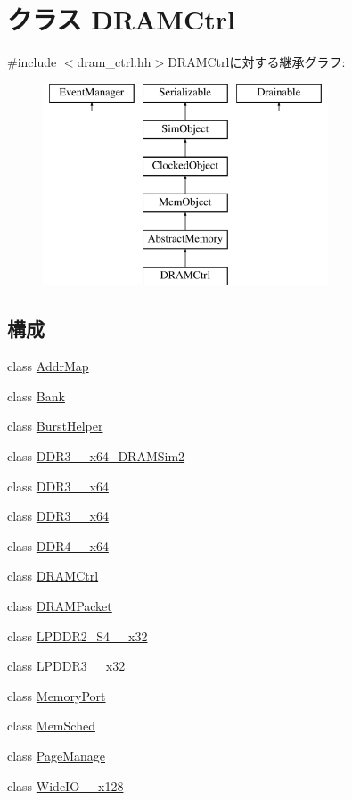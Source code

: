 \hypertarget{classDRAMCtrl}{
\section{クラス DRAMCtrl}
\label{classDRAMCtrl}
}


{\ttfamily \#include $<$dram\_\-ctrl.hh$>$}DRAMCtrlに対する継承グラフ:\begin{figure}[H]
\begin{center}
\leavevmode
\includegraphics[height=6cm]{classDRAMCtrl}
\end{center}
\end{figure}
\subsection*{構成}
\begin{DoxyCompactItemize}
\item 
class \hyperlink{classDRAMCtrl_1_1AddrMap}{AddrMap}
\item 
class \hyperlink{classDRAMCtrl_1_1Bank}{Bank}
\item 
class \hyperlink{classDRAMCtrl_1_1BurstHelper}{BurstHelper}
\item 
class \hyperlink{classDRAMCtrl_1_1DDR3__1333__x64__DRAMSim2}{DDR3\_\_\-x64\_\-DRAMSim2}
\item 
class \hyperlink{classDRAMCtrl_1_1DDR3__1600__x64}{DDR3\_\_\-x64}
\item 
class \hyperlink{classDRAMCtrl_1_1DDR3__2133__x64}{DDR3\_\_\-x64}
\item 
class \hyperlink{classDRAMCtrl_1_1DDR4__2400__x64}{DDR4\_\_\-x64}
\item 
class \hyperlink{classDRAMCtrl_1_1DRAMCtrl}{DRAMCtrl}
\item 
class \hyperlink{classDRAMCtrl_1_1DRAMPacket}{DRAMPacket}
\item 
class \hyperlink{classDRAMCtrl_1_1LPDDR2__S4__1066__x32}{LPDDR2\_\-S4\_\_\-x32}
\item 
class \hyperlink{classDRAMCtrl_1_1LPDDR3__1600__x32}{LPDDR3\_\_\-x32}
\item 
class \hyperlink{classDRAMCtrl_1_1MemoryPort}{MemoryPort}
\item 
class \hyperlink{classDRAMCtrl_1_1MemSched}{MemSched}
\item 
class \hyperlink{classDRAMCtrl_1_1PageManage}{PageManage}
\item 
class \hyperlink{classDRAMCtrl_1_1WideIO__200__x128}{WideIO\_\_\-x128}
\end{DoxyCompactItemize}
